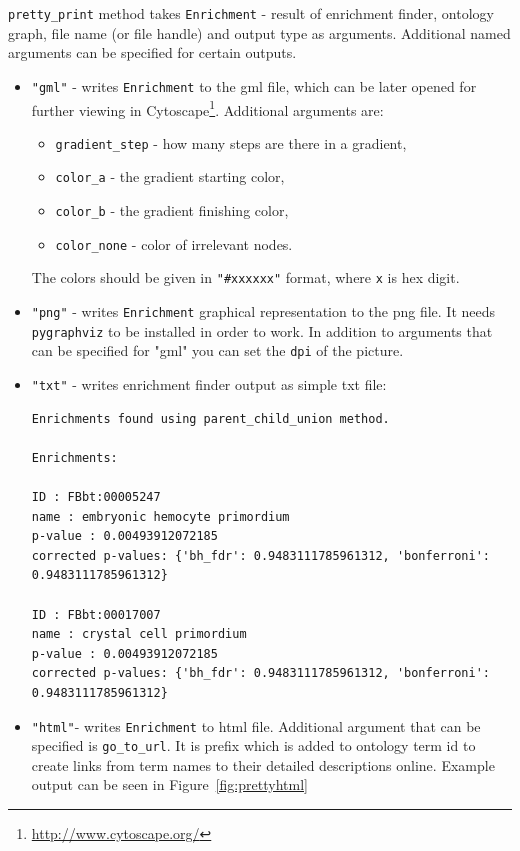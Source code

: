 \documentclass{report}
\begin{document}
\verb|pretty_print| method takes \verb|Enrichment| - result of enrichment finder, ontology graph,
file name (or file handle) and output type as arguments. Additional named
arguments can be specified for certain outputs.
\begin{itemize}
\item \verb|"gml"| - writes \verb|Enrichment| to the gml file, which can be later opened
for further viewing in Cytoscape\footnote{\url{http://www.cytoscape.org/}}.
Additional arguments are:
\begin{itemize}
\item \verb|gradient_step| - how many steps are there in a gradient,
\item \verb|color_a| - the gradient starting color,
\item \verb|color_b| - the gradient finishing color,
\item \verb|color_none| - color of irrelevant nodes.
\end{itemize}
The colors should be given in \verb|"#xxxxxx"| format, where \verb|x| is hex digit.
\item \verb|"png"| - writes \verb|Enrichment| graphical representation to the png file.
It needs \verb|pygraphviz| to be installed in order to work. In addition to arguments that
can be specified for "gml" you can set the \verb|dpi| of the picture.
\item \verb|"txt"| - writes enrichment finder output as simple txt file:
\begin{verbatim}
Enrichments found using parent_child_union method.

Enrichments:

ID : FBbt:00005247
name : embryonic hemocyte primordium
p-value : 0.00493912072185
corrected p-values: {'bh_fdr': 0.9483111785961312, 'bonferroni': 0.9483111785961312}

ID : FBbt:00017007
name : crystal cell primordium
p-value : 0.00493912072185
corrected p-values: {'bh_fdr': 0.9483111785961312, 'bonferroni': 0.9483111785961312}
\end{verbatim}

\item \verb|"html"|- writes \verb|Enrichment| to html file. Additional argument that
can be specified is \verb|go_to_url|. It is prefix which is added to ontology
term id to create links from term names to their detailed descriptions online.
Example output can be seen in Figure~\ref{fig:prettyhtml}


\begin{htmlonly}
\label{fig:prettyhtml}
\end{htmlonly}


\end{itemize}
\end{document}
